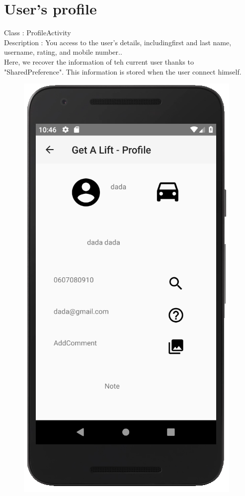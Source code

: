 \section{User's profile}
Class : ProfileActivity \\
Description : You access to the user’s details, includingfirst and last name, username, rating, and mobile number..\\
Here, we recover the information of teh current user thanks to "SharedPreference". This information is stored when the user connect himself.

\begin{figure}[H]
\begin{center}
\includegraphics[scale = 0.6]{diagrams/Profile.png} 
\end{center}
\end{figure}

